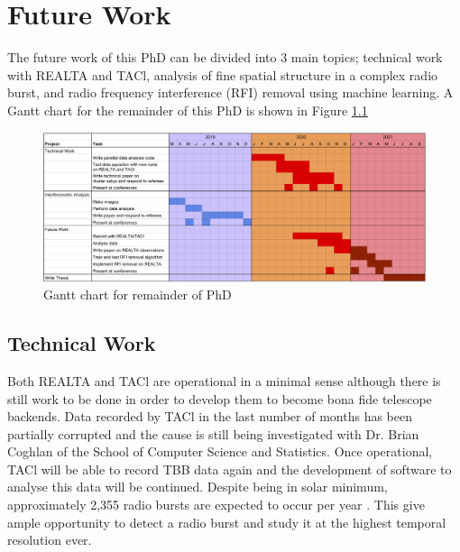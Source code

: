 \onehalfspacing
\chapter{Future Work}
\label{chap:future}
The future work of this PhD can be divided into 3 main topics; technical work with REALTA and TACl, analysis of fine spatial structure in a complex radio burst, and radio frequency interference (RFI) removal using machine learning. A Gantt chart for the remainder of this PhD is shown in Figure \ref{fig:Gantt}

\begin{figure}[t]
    \centering
    \includegraphics[width=0.75\columnwidth]{Images/PM_Ganttchart.png}
    \caption[Gantt chart for remainder of PhD]{Gantt chart for remainder of PhD}
    \label{fig:Gantt}
\end{figure}

\section{Technical Work}
Both REALTA and TACl are operational in a minimal sense although there is still work to be done in order to develop them to become bona fide telescope backends. Data recorded by TACl in the last number of months has been partially corrupted and the cause is still being investigated with Dr. Brian Coghlan of the School of Computer Science and Statistics. Once operational, TACl will be able to record TBB data again and the development of software to analyse this data will be continued. Despite being in solar minimum, approximately 2,355 radio bursts are expected to occur per year \citep{Nita2002}. This give ample opportunity to detect a radio burst and study it at the highest temporal resolution ever. %

